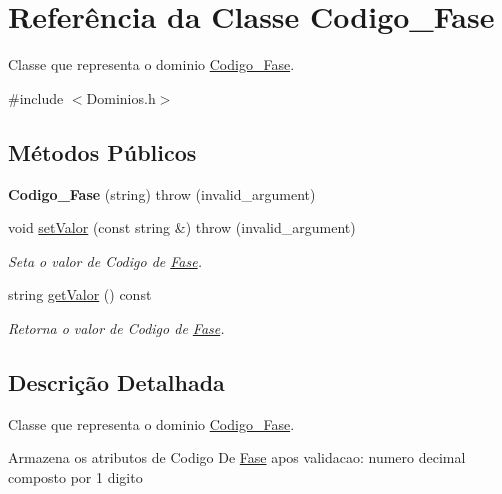 \hypertarget{class_codigo___fase}{
\section{\-Referência da \-Classe \-Codigo\-\_\-\-Fase}
\label{class_codigo___fase}
}


\-Classe que representa o dominio \hyperlink{class_codigo___fase}{\-Codigo\-\_\-\-Fase}.  




{\ttfamily \#include $<$\-Dominios.\-h$>$}

\subsection*{\-Métodos \-Públicos}
\begin{DoxyCompactItemize}
\item 
\hypertarget{class_codigo___fase_a95e4aaa46eb3c9508216d9914f10de9b}{
{\bfseries \-Codigo\-\_\-\-Fase} (string)  throw (invalid\-\_\-argument)}
\label{class_codigo___fase_a95e4aaa46eb3c9508216d9914f10de9b}

\item 
void \hyperlink{class_codigo___fase_a30ddd9595c79d2ba10d25a857ae01704}{set\-Valor} (const string \&)  throw (invalid\-\_\-argument)
\begin{DoxyCompactList}\small\item\em \-Seta o valor de \-Codigo de \hyperlink{class_fase}{\-Fase}. \end{DoxyCompactList}\item 
string \hyperlink{class_codigo___fase_ad6211e7c092a64788fe6b007addd48d3}{get\-Valor} () const 
\begin{DoxyCompactList}\small\item\em \-Retorna o valor de \-Codigo de \hyperlink{class_fase}{\-Fase}. \end{DoxyCompactList}\end{DoxyCompactItemize}


\subsection{\-Descrição \-Detalhada}
\-Classe que representa o dominio \hyperlink{class_codigo___fase}{\-Codigo\-\_\-\-Fase}. 

\-Armazena os atributos de \-Codigo \-De \hyperlink{class_fase}{\-Fase} apos validacao\-: numero decimal composto por 1 digito 

